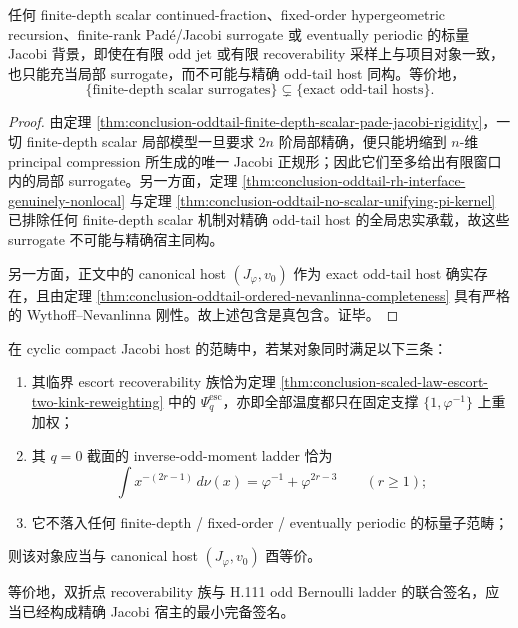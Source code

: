 \begin{corollary}\label{cor:conclusion-oddtail-finite-depth-surrogates-proper-subclass}
任何 finite-depth scalar continued-fraction、fixed-order hypergeometric recursion、finite-rank Pad\'e/Jacobi surrogate 或 eventually periodic 的标量 Jacobi 背景，即使在有限 odd jet 或有限 recoverability 采样上与项目对象一致，也只能充当局部 surrogate，而不可能与精确 odd-tail host 同构。等价地，
\[
\{\text{finite-depth scalar surrogates}\}
\subsetneq
\{\text{exact odd-tail hosts}\}.
\]
\end{corollary}
\begin{proof}
由定理 \ref{thm:conclusion-oddtail-finite-depth-scalar-pade-jacobi-rigidity}，一切 finite-depth scalar 局部模型一旦要求 \(2n\) 阶局部精确，便只能坍缩到 \(n\)-维 principal compression 所生成的唯一 Jacobi 正规形；因此它们至多给出有限窗口内的局部 surrogate。另一方面，定理 \ref{thm:conclusion-oddtail-rh-interface-genuinely-nonlocal} 与定理 \ref{thm:conclusion-oddtail-no-scalar-unifying-pi-kernel} 已排除任何 finite-depth scalar 机制对精确 odd-tail host 的全局忠实承载，故这些 surrogate 不可能与精确宿主同构。

另一方面，正文中的 canonical host \((J_\varphi,v_0)\) 作为 exact odd-tail host 确实存在，且由定理 \ref{thm:conclusion-oddtail-ordered-nevanlinna-completeness} 具有严格的 Wythoff--Nevanlinna 刚性。故上述包含是真包含。证毕。
\end{proof}

\begin{conjecture}\label{conj:conclusion-scaled-law-double-probe-jacobi-host-uniqueness}
在 cyclic compact Jacobi host 的范畴中，若某对象同时满足以下三条：
\begin{enumerate}
  \item 其临界 escort recoverability 族恰为定理 \ref{thm:conclusion-scaled-law-escort-two-kink-reweighting} 中的 \(\Psi_q^{\mathrm{esc}}\)，亦即全部温度都只在固定支撑 \(\{1,\varphi^{-1}\}\) 上重加权；
  \item 其 \(q=0\) 截面的 inverse-odd-moment ladder 恰为
  \[
  \int x^{-(2r-1)}\,d\nu(x)=\varphi^{-1}+\varphi^{2r-3}
  \qquad (r\ge 1);
  \]
  \item 它不落入任何 finite-depth / fixed-order / eventually periodic 的标量子范畴；
\end{enumerate}
则该对象应当与 canonical host \((J_\varphi,v_0)\) 酉等价。

等价地，双折点 recoverability 族与 H.111 odd Bernoulli ladder 的联合签名，应当已经构成精确 Jacobi 宿主的最小完备签名。
\end{conjecture}

